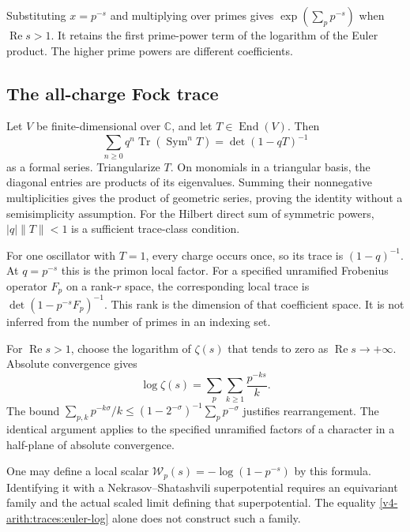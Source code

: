 Substituting $x=p^{-s}$ and multiplying over primes gives $\exp(\sum_p
p^{-s})$ when $\operatorname{Re}s>1$. It retains the first prime-power term
of the logarithm of the Euler product. The higher prime powers are different
coefficients.

\subsection{The all-charge Fock trace}

Let $V$ be finite-dimensional over $\mathbb C$, and let
$T\in\operatorname{End}(V)$. Then
\begin{equation}
\label{v4-arith:traces:fock-determinant}
 \sum_{n\geq0}q^n\operatorname{Tr}(\operatorname{Sym}^nT)
    =\det(1-qT)^{-1}
\end{equation}
as a formal series. Triangularize $T$. On monomials in a triangular basis,
the diagonal entries are products of its eigenvalues. Summing their
nonnegative multiplicities gives the product of geometric series, proving
the identity without a semisimplicity assumption. For the Hilbert direct sum
of symmetric powers, $|q|\|T\|<1$ is a sufficient trace-class condition.

For one oscillator with $T=1$, every charge occurs once, so its trace is
$(1-q)^{-1}$. At $q=p^{-s}$ this is the primon local factor. For a specified
unramified Frobenius operator $F_p$ on a rank-$r$ space, the corresponding
local trace is $\det(1-p^{-s}F_p)^{-1}$. This rank is the dimension of that
coefficient space. It is not inferred from the number of primes in an
indexing set.

For $\operatorname{Re}s>1$, choose the logarithm of $\zeta(s)$ that tends to
zero as $\operatorname{Re}s\to+\infty$. Absolute convergence gives
\begin{equation}
\label{v4-arith:traces:euler-log}
 \log\zeta(s)=\sum_p\sum_{k\geq1}\frac{p^{-ks}}k.
\end{equation}
The bound $\sum_{p,k}p^{-k\sigma}/k \leq(1-2^{-\sigma})^{-1}\sum_p
p^{-\sigma}$ justifies rearrangement. The identical argument applies to the
specified unramified factors of a character in a half-plane of absolute
convergence.

One may define a local scalar $\mathcal W_p(s)=-\log(1-p^{-s})$ by this
formula. Identifying it with a Nekrasov--Shatashvili superpotential requires
an equivariant family and the actual scaled limit defining that
superpotential. The equality \eqref{v4-arith:traces:euler-log} alone does
not construct such a family.

